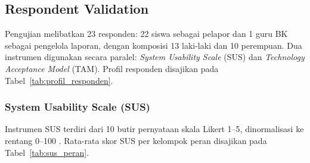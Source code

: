 \documentclass[conference]{IEEEtran}
\begin{document}
\subsection{Respondent Validation}

Pengujian melibatkan 23 responden: 22 siswa sebagai pelapor dan 1 guru BK sebagai pengelola laporan, dengan komposisi 13 laki-laki dan 10 perempuan. Dua instrumen digunakan secara paralel: \textit{System Usability Scale} (SUS) dan \textit{Technology Acceptance Model} (TAM). Profil responden disajikan pada Tabel~\ref{tab:profil_responden}.

\begin{table}[htbp]
\caption{Profil Responden (n = 23)}
\label{tab:profil_responden}
\begin{center}
\end{center}
\end{table}

\subsubsection{System Usability Scale (SUS)}
Instrumen SUS terdiri dari 10 butir pernyataan skala Likert 1--5, dinormalisasi ke rentang 0--100 \cite{zerovnik2024}. Rata-rata skor SUS per kelompok peran disajikan pada Tabel~\ref{tab:sus_peran}.

\begin{table}[htbp]
\caption{Rata-rata Skor SUS Menurut Peran (n = 23)}
\label{tab:sus_peran}
\begin{center}
\end{center}
\end{table}
\end{document}
